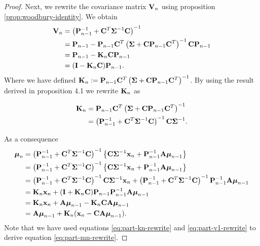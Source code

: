 \documentclass[11pt]{article}
\numberwithin{equation}{section}
\newcommand{\x}{{\bf x}}
\begin{document}
\begin{proof}
	Next, we rewrite the covariance matrix ${\bf V}_n$ using proposition \ref{prop:woodbury-identity}. We obtain
	\begin{align}
		{\bf V}_n &= \left({\bf P}_{n-1}^{-1} + {\bf C}^T \boldsymbol\Sigma^{-1}{\bf C}\right)^{-1} \\
				  &= {\bf P}_{n-1} - {\bf P}_{n-1} {\bf C}^T\left(\boldsymbol\Sigma + {\bf C}{\bf P}_{n-1}{\bf C}^T\right)^{-1}{\bf C}{\bf P}_{n-1} \\
				  &= {\bf P}_{n-1} - {\bf K}_n{\bf C}{\bf P}_{n-1} \\
				  &= ({\bf I}- {\bf K}_n{\bf C}){\bf P}_{n-1}.
	\end{align}
	Where we have defined ${\bf K}_n := {\bf P}_{n-1} {\bf C}^T\left(\boldsymbol\Sigma + {\bf C}{\bf P}_{n-1}{\bf C}^T\right)^{-1}$. By using the result derived in proposition 4.1 we rewrite ${\bf K}_n$ as
	
	\begin{align}
		{\bf K}_n &= {\bf P}_{n-1} {\bf C}^T\left(\boldsymbol\Sigma + {\bf C}{\bf P}_{n-1}{\bf C}^T\right)^{-1} \\
				  &= \left({\bf P}_{n-1}^{-1} + {\bf C}^T\boldsymbol\Sigma^{-1}{\bf C}\right)^{-1}{\bf C}\boldsymbol\Sigma^{-1}. \label{eq:part-kn-rewrite}
	\end{align}
	
	As a consequence
	\begin{align}
		\boldsymbol{\mu}_n &= \left({\bf P}_{n-1}^{-1} + {\bf C}^T \boldsymbol\Sigma^{-1}{\bf C}\right)^{-1} \left\{{\bf C}\boldsymbol\Sigma^{-1}\x_n + {\bf P}_{n-1}^{-1}{\bf A}\boldsymbol\mu_{n-1}\right\}\\
		&= \left({\bf P}_{n-1}^{-1} + {\bf C}^T \boldsymbol\Sigma^{-1}{\bf C}\right)^{-1} \left\{{\bf C}\boldsymbol\Sigma^{-1}\x_n + {\bf P}_{n-1}^{-1}{\bf A}\boldsymbol\mu_{n-1}\right\}\\
		&= \left({\bf P}_{n-1}^{-1} + {\bf C}^T \boldsymbol\Sigma^{-1}{\bf C}\right)^{-1} {\bf C}\boldsymbol\Sigma^{-1}\x_n + \left({\bf P}_{n-1}^{-1} + {\bf C}^T \boldsymbol\Sigma^{-1}{\bf C}\right)^{-1}{\bf P}_{n-1}^{-1}{\bf A}\boldsymbol\mu_{n-1}\\
		&= 	{\bf K}_n \x_n + ({\bf I} + {\bf K}_n {\bf C}){\bf P}_{n-1}{\bf P}_{n-1}^{-1}{\bf A}\boldsymbol\mu_{n-1} \label{eq:part-mn-rewrite}\\
		&= {\bf K}_n \x_n + {\bf A}\boldsymbol\mu_{n-1} - {\bf K}_n {\bf C}{\bf A}\boldsymbol\mu_{n-1}\\
		&= {\bf A}\boldsymbol{\mu}_{n-1} + {\bf K}_{n}(\x_n - {\bf CA}\boldsymbol\mu_{n-1}).
	\end{align}
	Note that we have used equations \eqref{eq:part-kn-rewrite} and \eqref{eq:part-v1-rewrite} to derive equation \eqref{eq:part-mn-rewrite}.
	

\end{proof}
\end{document}
